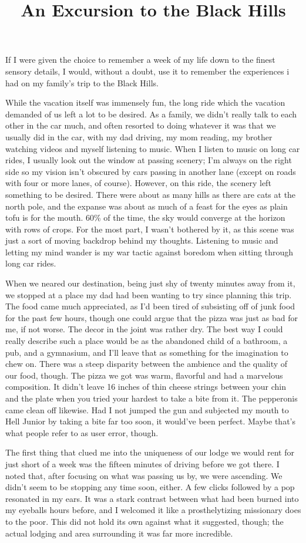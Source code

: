 \documentclass[12pt]{article}
\title{An Excursion to the Black Hills}
\begin{document}
\makeheader
\hspace{0.5in}
If I were given the choice to remember a week of my life down to the finest sensory details, I would, without a doubt, use it to remember the experiences i had on my family's trip to the Black Hills.

While the vacation itself was immensely fun, the long ride which the vacation demanded of us left a lot to be desired.  As a family, we didn't really talk to each other in the car much, and often resorted to doing whatever it was that we usually did in the car, with my dad driving, my mom reading, my brother watching videos and myself listening to music.  When I listen to music on long car rides, I usually look out the window at passing scenery;  I'm always on the right side so my vision isn't obscured by cars passing in another lane (except on roads with four or more lanes, of course).  However, on this ride, the scenery left something to be desired.  There were about as many hills as there are cats at the north pole, and the expanse was about as much of a feast for the eyes as plain tofu is for the mouth.  60\% of the time, the sky would converge at the horizon with rows of crops.  For the most part, I wasn't bothered by it, as this scene was just a sort of moving backdrop behind my thoughts.  Listening to music and letting my mind wander is my war tactic against boredom when sitting through long car rides.

When we neared our destination, being just shy of twenty minutes away from it, we stopped at a place my dad had been wanting to try since planning this trip.  The food came much appreciated, as I'd been tired of subsisting off of junk food for the past few hours, though one could argue that the pizza was just as bad for me, if not worse.  The decor in the joint was rather dry.  The best way I could really describe such a place would be as the abandoned child of a bathroom, a pub, and a gymnasium, and I'll leave that as something for the imagination to chew on.  There was a steep disparity between the ambience and the quality of our food, though.  The pizza we got was warm, flavorful and had a marvelous composition.  It didn't leave 16 inches of thin cheese strings between your chin and the plate when you tried your hardest to take a bite from it.  The pepperonis came clean off likewise.  Had I not jumped the gun and subjected my mouth to Hell Junior by taking a bite far too soon, it would've been perfect.  Maybe that's what people refer to as user error, though.

The first thing that clued me into the uniqueness of our lodge we would rent for just short of a week was the fifteen minutes of driving before we got there.  I noted that, after focusing on what was passing us by, we were ascending.  We didn't seem to be stopping any time soon, either.  A few clicks followed by a pop resonated in my ears.  It was a stark contrast between what had been burned into my eyeballs hours before, and I welcomed it like a prosthelytizing missionary does to the poor.  This did not hold its own against what it suggested, though;  the actual lodging and area surrounding it was far more incredible.
\end{document}
